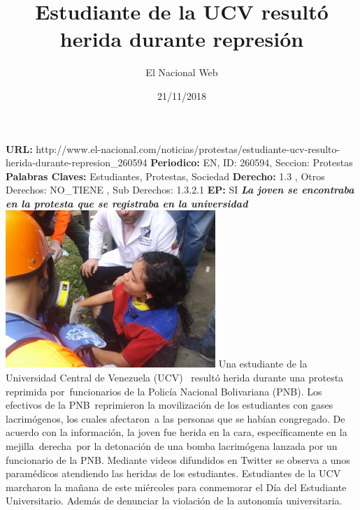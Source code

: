 \documentclass{article}%
\title{\textbf{Estudiante de la UCV resultó herida durante represión}}%
\author{El Nacional Web}%
\date{21/11/2018}%
\begin{document}
%
\normalsize%
\maketitle%
\textbf{URL: }%
http://www.el{-}nacional.com/noticias/protestas/estudiante{-}ucv{-}resulto{-}herida{-}durante{-}represion\_260594\newline%
%
\textbf{Periodico: }%
EN, %
ID: %
260594, %
Seccion: %
Protestas\newline%
%
\textbf{Palabras Claves: }%
Estudiantes, Protestas, Sociedad\newline%
%
\textbf{Derecho: }%
1.3%
, Otros Derechos: %
NO\_TIENE%
, Sub Derechos: %
1.3.2.1%
\newline%
%
\textbf{EP: }%
SI\newline%
\newline%
%
\textbf{\textit{La joven se encontraba en la protesta que se registraba en la universidad}}%
\newline%
\newline%
%
\includegraphics[width=300px]{70.jpg}%
\newline%
%
Una estudiante de la Universidad Central de Venezuela (UCV)~ resultó herida durante una protesta reprimida por~funcionarios de la Policía Nacional Bolivariana (PNB).%
\newline%
%
Los efectivos de la PNB~reprimieron la movilización de los estudiantes con gases lacrimógenos, los cuales afectaron~a las personas que se habían congregado.%
\newline%
%
De acuerdo con la información, la joven fue herida en la cara, específicamente en la mejilla~derecha~por la detonación de una bomba lacrimógena lanzada por un funcionario de la PNB.%
\newline%
%
Mediante videos difundidos en Twitter se observa a unos paramédicos atendiendo las heridas de los estudiantes.%
\newline%
%
Estudiantes de la UCV marcharon la mañana de este miércoles para conmemorar el Día del Estudiante Universitario. Además de denunciar la violación de la autonomía universitaria.%
\newline%
%
\end{document}
